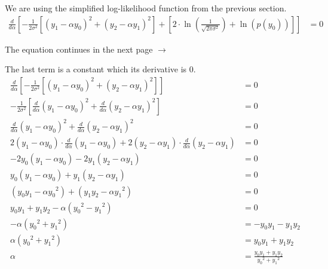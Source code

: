 \documentclass[12pt, a4paper]{article}
\begin{document}
            We are using the simplified log-likelihood function from the previous section.
            \begin{align*}
                \frac{d}{d\alpha}\left[
                    -\frac{1}{2\sigma^{2}} \left[
                        (y_{1} - \alpha y_{0})^{2} + (y_{2} - \alpha y_{1})^{2}
                    \right]
                    + \left[
                        2 \cdot \ln\left( \frac{1}{\sqrt{2\pi\sigma^{2}}} \right)
                        + \ln(p(y_{0}))
                    \right]
                \right] &= 0
            \end{align*}

            The equation continues in the next page $\rightarrow$

            The last term is a constant which its derivative is 0.
            \begin{align*}
                \frac{d}{d\alpha}\left[
                    -\frac{1}{2\sigma^{2}} \left[
                        (y_{1} - \alpha y_{0})^{2} + (y_{2} - \alpha y_{1})^{2}
                    \right]
                \right] &= 0 \\[1em]
                -\frac{1}{2\sigma^{2}} \left[
                    \frac{d}{d\alpha} (y_{1} - \alpha y_{0})^{2}
                    + \frac{d}{d\alpha} (y_{2} - \alpha y_{1})^{2}
                \right] &= 0 \\[1em]
                \frac{d}{d\alpha} (y_{1} - \alpha y_{0})^{2}
                + \frac{d}{d\alpha} (y_{2} - \alpha y_{1})^{2} &= 0 \\[1em]
                2(y_{1} - \alpha y_{0}) \cdot \frac{d}{d\alpha}(y_{1} - \alpha y_{0})
                + 2(y_{2} - \alpha y_{1}) \cdot \frac{d}{d\alpha}(y_{2} - \alpha y_{1}) &= 0 \\[1em]
                -2y_{0}(y_{1} - \alpha y_{0}) - 2y_{1}(y_{2} - \alpha y_{1}) &= 0 \\[1em]
                y_{0}(y_{1} - \alpha y_{0}) + y_{1}(y_{2} - \alpha y_{1}) &= 0 \\[1em]
                (y_{0}y_{1} - \alpha {y_{0}}^{2}) + (y_{1}y_{2} - \alpha {y_{1}}^{2}) &= 0 \\[1em]
                y_{0}y_{1} + y_{1}y_{2} - \alpha ({y_{0}}^{2} - {y_{1}}^{2}) &= 0 \\[1em]
                - \alpha ({y_{0}}^{2} + {y_{1}}^{2}) &= - y_{0}y_{1} - y_{1}y_{2} \\[1em]
                \alpha ({y_{0}}^{2} + {y_{1}}^{2}) &= y_{0}y_{1} + y_{1}y_{2} \\[1em]
                \alpha &= \frac{y_{0}y_{1} + y_{1}y_{2}}{{y_{0}}^{2} + {y_{1}}^{2}}
            \end{align*}
\end{document}
